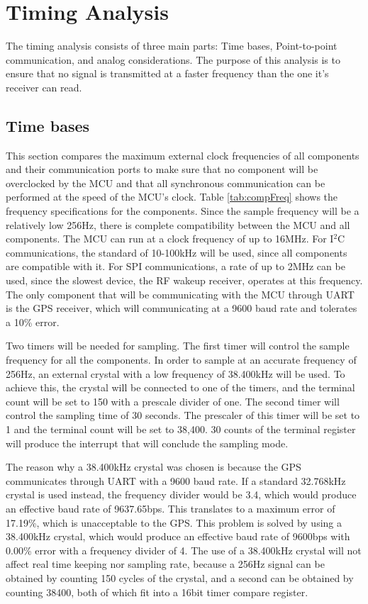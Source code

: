 \section{Timing Analysis}
The timing analysis consists of three main parts: Time bases, Point-to-point communication, and analog considerations. The purpose of this analysis is to ensure that no signal is transmitted at a faster frequency than the one it's receiver can read.

\subsection{Time bases}
This section compares the maximum external clock frequencies of all components and their communication ports to make sure that no component will be overclocked by the MCU and that all synchronous communication can be performed at the speed of the MCU's clock. Table \ref{tab:compFreq} shows the frequency specifications for the components.  Since the sample frequency will be a relatively low 256Hz, there is complete compatibility between the MCU and all components. The MCU can run at a clock frequency of up to 16MHz. For I$^2$C communications, the standard of 10-100kHz will be used, since all components are compatible with it. For SPI communications, a rate of up to 2MHz can be used, since the slowest device, the RF wakeup receiver, operates at this frequency. The only component that will be communicating with the MCU through UART is the GPS receiver, which will communicating at a 9600 baud rate and tolerates a 10\% error.

Two timers will be needed for sampling. The first timer will control the sample frequency for all the components.  In order to sample at an accurate frequency of 256Hz, an external crystal with a low frequency of 38.400kHz will be used. To achieve this, the crystal will be connected to one of the timers, and the terminal count will be set to 150 with a prescale divider of one. The second timer will control the sampling time of 30 seconds. The prescaler of this timer will be set to 1 and the terminal count will be set to 38,400. 30 counts of the terminal register will produce the interrupt that will conclude the sampling mode.

The reason why a 38.400kHz crystal was chosen is because the GPS communicates through UART with a 9600 baud rate. If a standard 32.768kHz crystal is used instead, the frequency divider would be 3.4, which would produce an effective baud rate of 9637.65bps. This translates to a maximum error of 17.19\%, which is unacceptable to the GPS. This problem is solved by using a 38.400kHz crystal, which would produce an effective baud rate of 9600bps with 0.00\% error with a frequency divider of 4. The use of a 38.400kHz crystal will not affect real time keeping nor sampling rate, because a 256Hz signal can be obtained by counting 150 cycles of the crystal, and a second can be obtained by counting 38400, both of which fit into a 16bit timer compare register.

